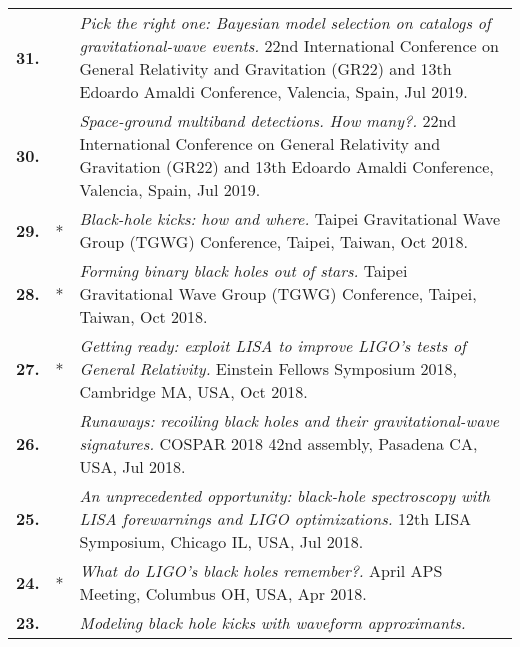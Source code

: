 {\begin{longtable}{rp{0.3cm}p{15.8cm}}
%
\textbf{31.} &  & \textit{Pick the right one: Bayesian model selection on catalogs of gravitational-wave events.}
\newline{}
22nd International Conference on General Relativity and Gravitation (GR22) and 13th Edoardo Amaldi Conference, Valencia, Spain, Jul 2019.
\vspace{0.05cm}\\
%
\textbf{30.} &  & \textit{Space-ground multiband detections. How many?.}
\newline{}
22nd International Conference on General Relativity and Gravitation (GR22) and 13th Edoardo Amaldi Conference, Valencia, Spain, Jul 2019.
\vspace{0.05cm}\\
%
\textbf{29.} & * & \textit{Black-hole kicks: how and where.}
\newline{}
Taipei Gravitational Wave Group (TGWG) Conference, Taipei, Taiwan, Oct 2018.
\vspace{0.05cm}\\
%
\textbf{28.} & * & \textit{Forming binary black holes out of stars.}
\newline{}
Taipei Gravitational Wave Group (TGWG) Conference, Taipei, Taiwan, Oct 2018.
\vspace{0.05cm}\\
%
\textbf{27.} & * & \textit{Getting ready: exploit LISA to improve LIGO's tests of General Relativity.}
\newline{}
Einstein Fellows Symposium 2018, Cambridge MA, USA, Oct 2018.
\vspace{0.05cm}\\
%
\textbf{26.} &  & \textit{Runaways: recoiling black holes and their gravitational-wave signatures.}
\newline{}
COSPAR 2018 42nd assembly, Pasadena CA, USA, Jul 2018.
\vspace{0.05cm}\\
%
\textbf{25.} &  & \textit{An unprecedented opportunity: black-hole spectroscopy with LISA forewarnings and LIGO optimizations.}
\newline{}
12th LISA Symposium, Chicago IL, USA, Jul 2018.
\vspace{0.05cm}\\
%
\textbf{24.} & * & \textit{What do LIGO's black holes remember?.}
\newline{}
April APS Meeting, Columbus OH, USA, Apr 2018.
\vspace{0.05cm}\\
%
\textbf{23.} &  & \textit{Modeling black hole kicks with waveform approximants.}

\end{longtable}}
